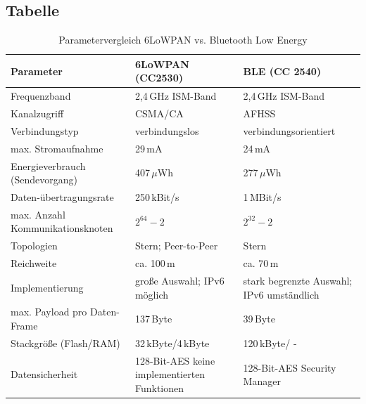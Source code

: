\subsection{Tabelle}

\begin{table}[h!]
  \centering  
  \begin{tabular}{|p{3cm}||p{4cm}|p{4cm}|}
    \hline \textbf{Parameter} & \textbf{6LoWPAN (CC2530)} & \textbf{BLE (CC
2540)} \\ 
    \hline
    \hline Frequenzband & 2,4\,GHz ISM-Band & 2,4\,GHz ISM-Band \\
    \hline Kanalzugriff & CSMA/CA & AFHSS \\
    \hline Verbindungstyp & verbindungslos & verbindungsorientiert \\
    \hline max. Stromaufnahme & \vspace{1pt}29\,mA & \vspace{1pt}24\,mA \\ 
    \hline Energieverbrauch (Sendevorgang) & \vspace{1pt}407\,$\mu$Wh &
\vspace{1pt}277\,$\mu$Wh \\ 
    \hline Daten-übertragungsrate & \vspace{1pt}250\,kBit/s &
\vspace{1pt}1\,MBit/s \\
    \hline max. Anzahl Kommunikationsknoten & \vspace{1pt}$2^{64}-2$ &
\vspace{1pt}$2^{32}-2$ \\
    \hline Topologien & Stern; Peer-to-Peer & Stern \\
    \hline Reichweite & ca. 100\,m & ca. 70\,m \\
    \hline Implementierung & große Auswahl; IPv6 möglich & stark begrenzte
Auswahl; IPv6 umständlich \\
    \hline max. Payload pro Daten-Frame & \vspace{1pt}137\,Byte &
\vspace{1pt}39\,Byte \\
    \hline Stackgröße (Flash/RAM) & \vspace{0.5pt}32\,kByte/4\,kByte &
\vspace{0.5pt}120\,kByte/ - \\
    \hline Datensicherheit & 128-Bit-AES keine implementierten Funktionen &
128-Bit-AES Security Manager \\
    \hline
  \end{tabular}
  \caption{Parametervergleich 6LoWPAN vs. Bluetooth Low Energy}\label{tab:ver}
\end{table}

